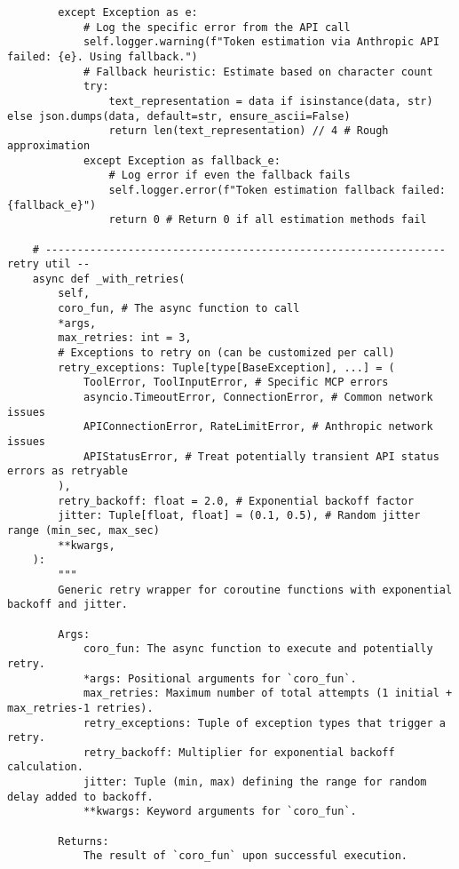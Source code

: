 \documentclass[12pt,a4paper]{article}
\begin{document}
\begin{pageablecode}
\begin{verbatim}
        except Exception as e:
            # Log the specific error from the API call
            self.logger.warning(f"Token estimation via Anthropic API failed: {e}. Using fallback.")
            # Fallback heuristic: Estimate based on character count
            try:
                text_representation = data if isinstance(data, str) else json.dumps(data, default=str, ensure_ascii=False)
                return len(text_representation) // 4 # Rough approximation
            except Exception as fallback_e:
                # Log error if even the fallback fails
                self.logger.error(f"Token estimation fallback failed: {fallback_e}")
                return 0 # Return 0 if all estimation methods fail

    # --------------------------------------------------------------- retry util --
    async def _with_retries(
        self,
        coro_fun, # The async function to call
        *args,
        max_retries: int = 3,
        # Exceptions to retry on (can be customized per call)
        retry_exceptions: Tuple[type[BaseException], ...] = (
            ToolError, ToolInputError, # Specific MCP errors
            asyncio.TimeoutError, ConnectionError, # Common network issues
            APIConnectionError, RateLimitError, # Anthropic network issues
            APIStatusError, # Treat potentially transient API status errors as retryable
        ),
        retry_backoff: float = 2.0, # Exponential backoff factor
        jitter: Tuple[float, float] = (0.1, 0.5), # Random jitter range (min_sec, max_sec)
        **kwargs,
    ):
        """
        Generic retry wrapper for coroutine functions with exponential backoff and jitter.

        Args:
            coro_fun: The async function to execute and potentially retry.
            *args: Positional arguments for `coro_fun`.
            max_retries: Maximum number of total attempts (1 initial + max_retries-1 retries).
            retry_exceptions: Tuple of exception types that trigger a retry.
            retry_backoff: Multiplier for exponential backoff calculation.
            jitter: Tuple (min, max) defining the range for random delay added to backoff.
            **kwargs: Keyword arguments for `coro_fun`.

        Returns:
            The result of `coro_fun` upon successful execution.


\end{verbatim}
\end{pageablecode}
\end{document}
